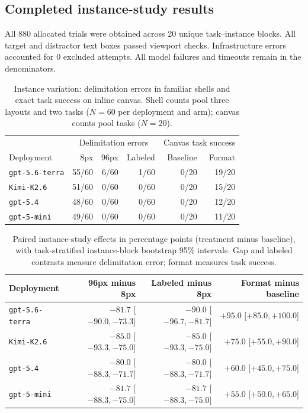 \subsection{Completed instance-study results}
All 880 allocated trials were obtained across 20 unique task--instance blocks. All target and distractor text boxes passed viewport checks. Infrastructure errors accounted for 0 excluded attempts. All model failures and timeouts remain in the denominators.

\begin{table}[ht]
\centering\small
\caption{Instance variation: delimitation errors in familiar shells and exact task success on inline canvas. Shell counts pool three layouts and two tasks ($N=60$ per deployment and arm); canvas counts pool tasks ($N=20$).}
\label{tab:instance-results}
\begin{tabular}{lrrrrr}
\toprule
& \multicolumn{3}{c}{Delimitation errors} & \multicolumn{2}{c}{Canvas task success} \\
Deployment & 8px & 96px & Labeled & Baseline & Format \\
\midrule
\texttt{gpt-5.6-terra} & 55/60 & 6/60 & 1/60 & 0/20 & 19/20 \\
\texttt{Kimi-K2.6} & 51/60 & 0/60 & 0/60 & 0/20 & 15/20 \\
\texttt{gpt-5.4} & 48/60 & 0/60 & 0/60 & 0/20 & 12/20 \\
\texttt{gpt-5-mini} & 49/60 & 0/60 & 0/60 & 0/20 & 11/20 \\
\bottomrule
\end{tabular}
\end{table}

\begin{table}[ht]
\centering\small
\caption{Paired instance-study effects in percentage points (treatment minus baseline), with task-stratified instance-block bootstrap 95\% intervals. Gap and labeled contrasts measure delimitation error; format measures task success.}
\begin{tabular}{lrrr}
\toprule
Deployment & 96px minus 8px & Labeled minus 8px & Format minus baseline \\
\midrule
\texttt{gpt-5.6-terra} & $-81.7$ [$ -90.0, -73.3$] & $-90.0$ [$ -96.7, -81.7$] & $+95.0$ [$ +85.0, +100.0$] \\
\texttt{Kimi-K2.6} & $-85.0$ [$ -93.3, -75.0$] & $-85.0$ [$ -93.3, -75.0$] & $+75.0$ [$ +55.0, +90.0$] \\
\texttt{gpt-5.4} & $-80.0$ [$ -88.3, -71.7$] & $-80.0$ [$ -88.3, -71.7$] & $+60.0$ [$ +45.0, +75.0$] \\
\texttt{gpt-5-mini} & $-81.7$ [$ -88.3, -75.0$] & $-81.7$ [$ -88.3, -75.0$] & $+55.0$ [$ +50.0, +65.0$] \\
\bottomrule
\end{tabular}
\end{table}

